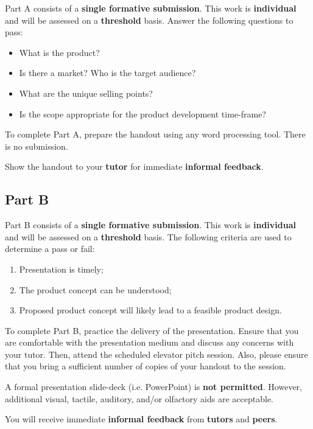 \documentclass{../fal_assignment}
\begin{document}
Part A consists of a \textbf{single formative submission}. This work is \textbf{individual} and will be assessed on a \textbf{threshold} basis. Answer the following questions to pass:

\begin{itemize}
	\item What is the product?
	\item Is there a market? Who is the target audience?
	\item What are the unique selling points?
	\item Is the scope appropriate for the product development time-frame?
\end{itemize}

To complete Part A, prepare the handout using any word processing tool. There is no submission.

Show the handout to your \textbf{tutor} for immediate \textbf{informal feedback}.

\subsection*{Part B}

Part B consists of a \textbf{single formative submission}. This work is \textbf{individual} and will be assessed on a \textbf{threshold} basis. The following criteria are used to determine a pass or fail:

\begin{enumerate}[label=(\alph*)]
	\item Presentation is timely;
	\item The product concept can be understood;
	\item Proposed product concept will likely lead to a feasible product design.
\end{enumerate}

To complete Part B, practice the delivery of the presentation. Ensure that you are comfortable with the presentation medium and discuss any concerns with your tutor. Then, attend the scheduled elevator pitch session. Also, please ensure that you bring a sufficient number of copies of your handout to the session.

A formal presentation slide-deck (i.e. PowerPoint) is \textbf{not permitted}. However, additional visual, tactile, auditory, and/or olfactory aids are acceptable.

You will receive immediate \textbf{informal feedback} from \textbf{tutors} and \textbf{peers}.
\end{document}
